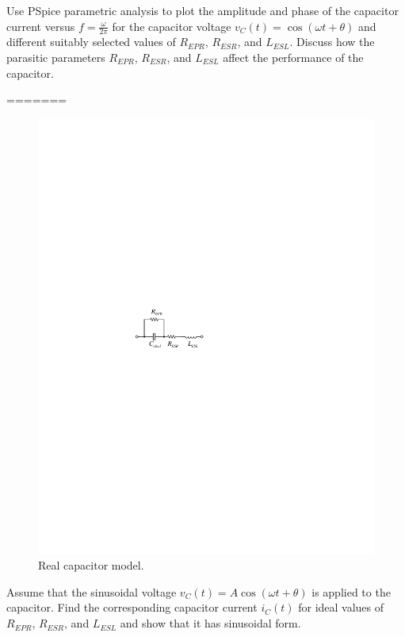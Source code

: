 \documentclass[11pt]{article}
\begin{document}
\begin{question}
\begin{subquestion}{Use PSpice parametric analysis to plot the amplitude and phase of the capacitor current versus $f=\frac{\omega}{2\pi}$ for the capacitor voltage $v_C(t)=\cos(\omega t+\theta)$ and different suitably selected values of $R_{EPR}$, $R_{ESR}$, and $L_{ESL}$. Discuss how the parasitic parameters $R_{EPR}$, $R_{ESR}$, and $L_{ESL}$ affect the performance of the capacitor. } 
\answer{}
\end{subquestion}
=======

    \begin{figure}[H]
        \centering
        \includegraphics[scale=1.5,angle=0]{Fig/cir4.pdf}
        \caption{Real capacitor model.} \label{fig:cir4}
    \end{figure}

    \begin{subquestion}{Assume that the sinusoidal voltage $v_C(t)=A\cos(\omega t+\theta)$ is applied to the capacitor. Find the corresponding capacitor current $i_C(t)$ for ideal values of $R_{EPR}$, $R_{ESR}$, and $L_{ESL}$ and show that it has sinusoidal form.}
        \answer{}
    \end{subquestion}


\end{question}
\end{document}
